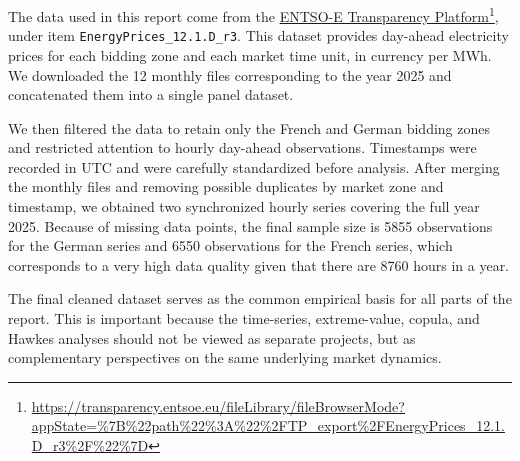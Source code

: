 The data used in this report come from the \href{https://transparency.entsoe.eu/fileLibrary/fileBrowserMode?appState=\%7B\%22path\%22\%3A\%22\%2FTP_export\%2FEnergyPrices_12.1.D_r3\%2F\%22\%7D}{ENTSO-E Transparency Platform}\footnote{\url{https://transparency.entsoe.eu/fileLibrary/fileBrowserMode?appState=\%7B\%22path\%22\%3A\%22\%2FTP_export\%2FEnergyPrices_12.1.D_r3\%2F\%22\%7D}}, under item \texttt{EnergyPrices\_12.1.D\_r3}. This dataset provides day-ahead electricity prices for each bidding zone and each market time unit, in currency per MWh. We downloaded the 12 monthly files corresponding to the year 2025 and concatenated them into a single panel dataset.

We then filtered the data to retain only the French and German bidding zones and restricted attention to hourly day-ahead observations. Timestamps were recorded in UTC and were carefully standardized before analysis. After merging the monthly files and removing possible duplicates by market zone and timestamp, we obtained two synchronized hourly series covering the full year 2025. Because of missing data points, the final sample size is 5855 observations for the German series and 6550 observations for the French series, which corresponds to a very high data quality given that there are 8760 hours in a year.

The final cleaned dataset serves as the common empirical basis for all parts of the report. This is important because the time-series, extreme-value, copula, and Hawkes analyses should not be viewed as separate projects, but as complementary perspectives on the same underlying market dynamics.
